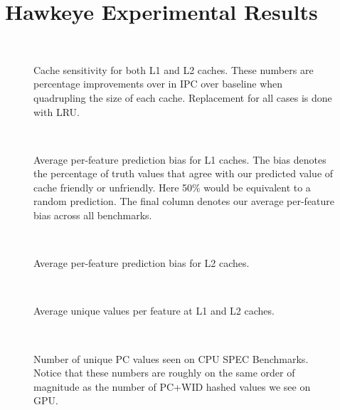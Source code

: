 \chapter{Hawkeye Experimental Results}

\begin{figure}[htb]
\begin{center}
\ 
\caption{Cache sensitivity for both L1 and L2 caches. These numbers are percentage improvements over in IPC over baseline when quadrupling the size of each cache. Replacement for all cases is done with LRU.}
\label{f:sensitivity}
\end{center}
\end{figure}

\begin{figure}[htb]
\begin{center}
\ 
\caption{Average per-feature prediction bias for L1 caches. The bias denotes the percentage of truth values that agree with our predicted value of cache friendly or unfriendly. Here 50\% would be equivalent to a random prediction. The final column denotes our average per-feature bias across all benchmarks.}
\label{f:l1_bias}
\end{center}
\end{figure}

\begin{figure}[htb]
\begin{center}
\ 
\caption{Average per-feature prediction bias for L2 caches.}
\label{f:l2_bias}
\end{center}
\end{figure}

\begin{figure}[htb]
\begin{center}
\ 
\caption{Average unique values per feature at L1 and L2 caches.}
\label{f:opt_uniq_vals}
\end{center}
\end{figure}

\begin{figure}[htb]
\begin{center}
\ 
\caption{Number of unique PC values seen on CPU SPEC Benchmarks. Notice that these numbers are roughly on the same order of magnitude as the number of PC+WID hashed values we see on GPU.}
\label{f:cpu_opt_uniq_vals}
\end{center}
\end{figure}

